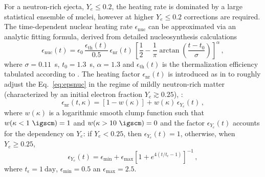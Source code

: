 For a neutron-rich ejecta, $Y_e\leq0.2$, the heating rate is dominated by a large statistical 
ensemble of nuclei, however at higher $Y_e\leq0.2$ corrections are required. 
The time-dependent nuclear heating rate $\epsilon_{\text{nuc}}$  
can be approximated via an analytic fitting formula, derived from detailed nucleosynthesis 
calculations~\citep{Korobkin:2012uy}  
%
\begin{equation}
\label{eq:kilonova:eps_korob}
\epsilon_{\text{nuc}}(t)= \epsilon_0 \, \frac{\epsilon_{\text{th}}(t)}{0.5} \, \epsilon_{\text{nr}}(t) \,
\left[ \frac{1}{2} - \frac{1}{\pi} \arctan\left(\frac{t-t_0}{\sigma}\right)\right]^{\alpha}\,,
\end{equation}
%
where $\sigma = 0.11$~s, $t_0 = 1.3$~s, $\alpha=1.3$ and $\epsilon_{\text{th}}(t)$ is the 
thermalization efficiency tabulated according to \citet{Barnes:2016umi}.
%
The heating factor $\epsilon_{\text{nr}}(t) $ is introduced as in \citet{Perego:2017wtu} to roughly adjust 
the Eq.~\eqref{eq:epsnuc} in the regime of mildly neutron-rich matter (characterized by an initial 
electron fraction $Y_e \gtrsim 0.25$), \citep[see, \eg][]{Martin:2015hxa}:
%
\begin{equation}
\label{eq:epsnr}
\epsilon_{\text{nr}}(t,\kappa) = \left[1-w(\kappa)\right] + w(\kappa)\,\epsilon_{Y_e}(t)\,,  
\end{equation}
%
where $w(\kappa)$ is a logarithmic smooth clump function such that $w(\kappa < 1~\igscm) = 1$ and 
$w(\kappa > 10~\igscm)=0$ and the factor $\epsilon_{Y_e}(t)$ accounts for the dependency on $Y_e$:
if $Y_e < 0.25$, then $\epsilon_{Y_e}(t)=1$, otherwise, when $Y_e \ge 0.25$,
%
\begin{equation}
\label{eq:epsye}
\epsilon_{Y_e}(t) =\epsilon_{\text{min}}+{\epsilon_{\text{max}}}{\left[1+ e ^{4(t/t_\epsilon-1)}\right]}^{-1}\,,
\end{equation}
%
where $t_\epsilon = 1~{\text{day}}$, $\epsilon_{\text{min}}=0.5$ an $\epsilon_{\text{max}} = 2.5$.



